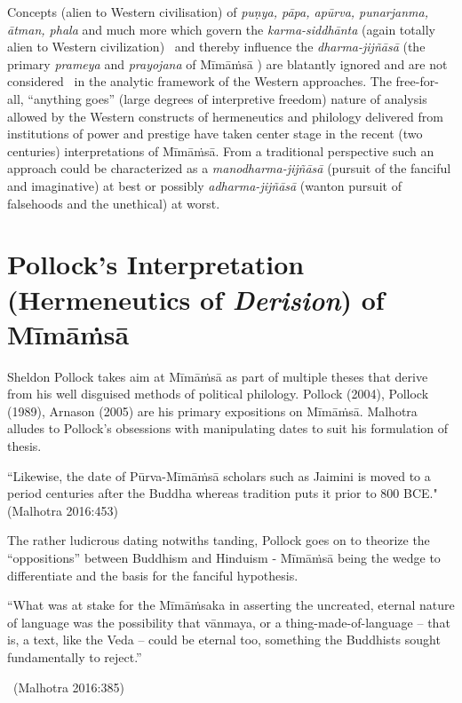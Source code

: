 Concepts (alien to Western civilisation) of \textit{puṇya, pāpa, apūrva, punarjanma, ātman, phala} and much more which govern the \textit{karma-siddhānta} (again totally alien to Western civilization)  and thereby influence the \textit{dharma-jijñāsā} (the primary \textit{prameya} and \textit{prayojana} of Mīmāṁsā ) are blatantly ignored and are not considered  in the analytic framework of the Western approaches. The free-for-all, “anything goes” (large degrees of interpretive freedom) nature of analysis allowed by the Western constructs of hermeneutics and philology delivered from institutions of power and prestige have taken center stage in the recent (two centuries) interpretations of Mīmāṁsā. From a traditional perspective such an approach could be characterized as a \textit{manodharma-jijñāsā} (pursuit of the fanciful and imaginative) at best or possibly \textit{adharma-jijñāsā} (wanton pursuit of falsehoods and the unethical) at worst.


\section*{Pollock’s Interpretation (Hermeneutics of \textit{Derision}) of Mīmāṁsā}

Sheldon Pollock takes aim at Mīmāṁsā as part of multiple theses that derive from his well disguised methods of political philology. Pollock (2004), Pollock (1989), Arnason (2005) are his primary expositions on Mīmāṁsā. Malhotra alludes to Pollock’s obsessions with manipulating dates to suit his formulation of thesis.

\begin{myquote}
“Likewise, the date of Pūrva-Mīmāṁsā scholars such as Jaimini is moved to a period centuries after the Buddha whereas tradition puts it prior to 800 BCE."\hfill (Malhotra 2016:453)
\end{myquote}

The rather ludicrous dating notwiths tanding, Pollock goes on to theorize the “oppositions” between Buddhism and Hinduism - Mīmāṁsā being the wedge to differentiate and the basis for the fanciful hypothesis.

\begin{myquote}
“What was at stake for the Mīmāṁsaka in asserting the uncreated, eternal nature of language was the possibility that vānmaya, or a thing-made-of-language – that is, a text, like the Veda – could be eternal too, something the Buddhists sought fundamentally to reject.”

~\hfill (Malhotra 2016:385)
\end{myquote}

